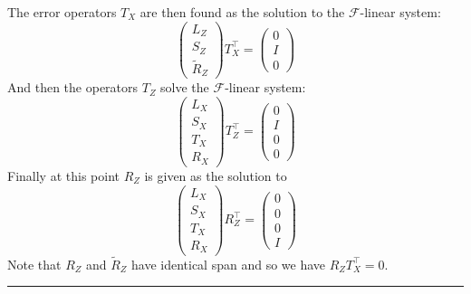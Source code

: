 \documentclass[11pt,oneside]{article}
\newcommand{\Field}{\mathcal{F}}
\newcommand\tombstone{\rule{.36em}{2ex}\vskip 5pt}
\begin{document}
The error operators $T_X$ are then found as the solution
to the $\Field$-linear system:
$$
\left( \begin{array}{l}
L_Z\\
S_Z\\
\widetilde{R}_Z
\end{array} \right)
T_X^\top = 
\left( \begin{array}{l}
0\\
I\\
0
\end{array} \right)
$$
And then the operators $T_Z$ solve the $\Field$-linear system:
$$
\left( \begin{array}{l}
L_X\\
S_X\\
T_X\\
R_X
\end{array} \right)
T_Z^\top = 
\left( \begin{array}{l}
0\\
I\\
0\\
0
\end{array} \right)
$$
Finally at this point $R_Z$ is given as the solution to
$$
\left( \begin{array}{l}
L_X\\
S_X\\
T_X\\
R_X
\end{array} \right)
R_Z^\top = 
\left( \begin{array}{l}
0\\
0\\
0\\
I
\end{array} \right)
$$
Note that $R_Z$ and $\widetilde{R}_Z$ have identical span 
and so we have $R_Z T_X^\top = 0.$
\tombstone
\end{document}
